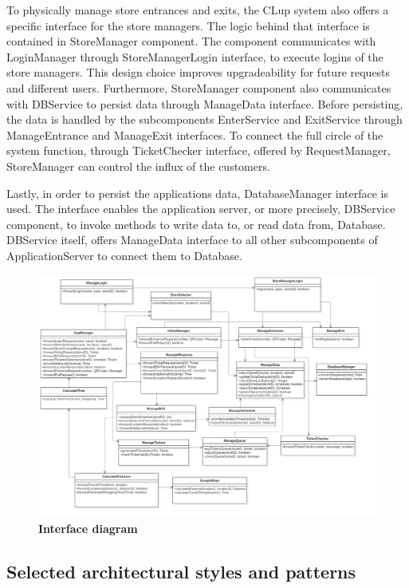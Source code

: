 To physically manage store entrances and exits, the CLup system also offers a specific interface for the store managers. The logic behind that interface is contained in StoreManager component. The component communicates with LoginManager through StoreManagerLogin interface, to execute logins of the store managers. This design choice improves upgradeability for future requests and different users. Furthermore, StoreManager component also communicates with DBService to persist data through ManageData interface. Before persisting, the data is handled by the subcomponents EnterService and ExitService through ManageEntrance and ManageExit interfaces. To connect the full circle of the system function, through TicketChecker interface, offered by RequestManager, StoreManager can control the influx of the customers. \newline


Lastly, in order to persist the applications data, DatabaseManager interface is used. The interface enables the application server, or more precisely, DBService component, to invoke methods to write data to, or read data from, Database. DBService itself, offers ManageData interface to all other subcomponents of ApplicationServer to connect them to Database. \newline

\begin{figure}[!h]
\centering
\includegraphics[width=\textwidth]{Images/InterfaceDiagram}
\caption{\label{fig:interfacediagram}\textbf{Interface diagram}}
\end{figure}

\newpage
\subsection{Selected architectural styles and patterns}

